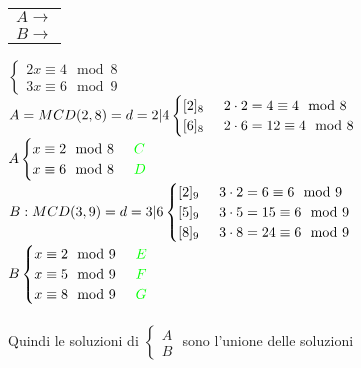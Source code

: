 {\color{blue}
    \begin{tabular}{c}
        $A\rightarrow$\\
        $B\rightarrow$
    \end{tabular}
}
$
\begin{cases} 
    2x\equiv 4\mod 8 \\
    3x\equiv 6\mod 9 
\end{cases} 
$\\
$A=MCD(2,8)=d=2|4
\begin{cases}
    [2]_8\hspace{0.5cm}2\cdot 2=4\equiv 4\mod 8\\
    [6]_8\hspace{0.5cm}2\cdot 6=12\equiv 4\mod 8
\end{cases}
$\\
$
A
\begin{cases}
    x\equiv 2\mod 8 \hspace{0.5cm} {\color{green} C}\\
    x\equiv 6\mod 8 \hspace{0.5cm} {\color{green} D}\\
\end{cases}
$\\
$
B: MCD(3,9)=d=3|6
\begin{cases}
    [2]_9 \hspace{.5cm} 3\cdot 2=6\equiv 6\mod 9\\
    [5]_9 \hspace{.5cm} 3\cdot 5=15\equiv 6\mod 9\\
    [8]_9 \hspace{.5cm} 3\cdot 8=24\equiv 6\mod 9\\
\end{cases}
$\\
$
B
\begin{cases}
    x\equiv 2\mod 9 \hspace{0.5cm} {\color{green} E}\\
    x\equiv 5\mod 9 \hspace{0.5cm} {\color{green} F}\\
    x\equiv 8\mod 9 \hspace{0.5cm} {\color{green} G}
\end{cases}
$\\
\\
Quindi le soluzioni di $\begin{cases}A\\B\end{cases}$ sono l'unione delle soluzioni
